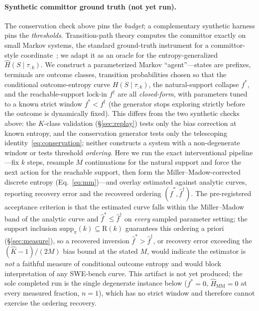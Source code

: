 \documentclass[11pt]{article}
\newcommand{\Hk}{\widehat{H}\!\left(S \mid \tau_{:k}\right)}
\newcommand{\strat}{S}
\begin{document}
\paragraph{Synthetic committor ground truth (not yet run).}
The conservation check above pins the \emph{budget}; a complementary synthetic
harness pins the \emph{thresholds}. Transition-path theory computes the committor
exactly on small Markov systems, the standard ground-truth instrument for a
committor-style coordinate~\citep{evanden2010tpt}; we adapt it as an oracle for the
entropy-generalized $\Hk$. We construct a parameterized Markov ``agent''---states are
prefixes, terminals are outcome classes, transition probabilities chosen so that the
conditional outcome-entropy curve $H(\strat\mid\tau_{:k})$, the natural-support
collapse $f^\ast$, and the reachable-support lock-in $f^\dagger$ are all
\emph{closed-form}, with parameters tuned to a known strict window $f^\ast<f^\dagger$
(the generator stops exploring strictly before the outcome is dynamically fixed).
This differs from the two synthetic checks above: the $K$-class validation
(\S\ref{sec:replay}) tests only the bias correction at known entropy, and the
conservation generator tests only the telescoping identity~\eqref{eq:conservation};
neither constructs a system with a non-degenerate window or tests threshold
\emph{ordering}. Here we run the exact interventional pipeline---fix $k$ steps,
resample $M$ continuations for the natural support and force the next action for the
reachable support, then form the Miller--Madow-corrected discrete entropy
(Eq.~\eqref{eq:mm})---and overlay estimated against analytic curves, reporting
recovery error and the recovered ordering $(\widehat f^\ast,\widehat f^\dagger)$. The
pre-registered acceptance criterion is that the estimated curve falls within the
Miller--Madow band of the analytic curve and $\widehat f^\ast\le\widehat f^\dagger$ on
\emph{every} sampled parameter setting; the support inclusion
$\mathrm{supp}_\pi(k)\subseteq\mathrm{R}(k)$ guarantees this ordering a priori
(\S\ref{sec:measure}), so a recovered inversion $\widehat f^\ast>\widehat f^\dagger$,
or recovery error exceeding the $(\hat K-1)/(2M)$ bias bound at the stated $M$, would
indicate the estimator is \emph{not} a faithful measure of conditional outcome
entropy and would block interpretation of any SWE-bench curve. This artifact is not
yet produced; the sole completed run is the single degenerate instance below
($f^\ast=0$, $\widehat{H}_{\mathrm{MM}}=0$ at every measured fraction, $n\!=\!1$),
which has no strict window and therefore cannot exercise the ordering recovery.
\end{document}
